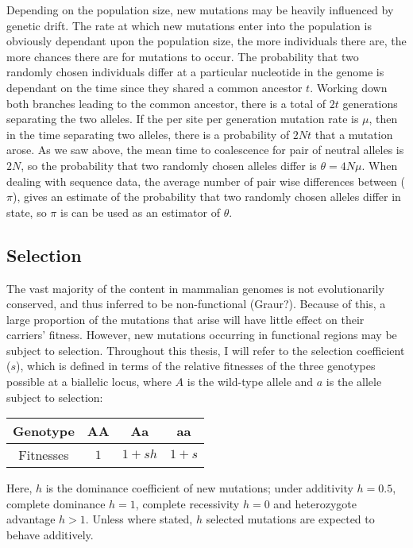 	Depending on the population size, new mutations may be heavily influenced by genetic drift. The rate at which new mutations enter into the population is obviously dependant upon the population size, the more individuals there are, the more chances there are for mutations to occur. The probability that two randomly chosen individuals differ at a particular nucleotide in the genome is dependant on the time since they shared a common ancestor $t$. Working down both branches leading to the common ancestor, there is a total of $2t$ generations separating the two alleles. If the per site per generation mutation rate is $\mu$, then in the time separating two alleles, there is a probability of $2Nt$ that a mutation arose. As we saw above, the mean time to coalescence for pair of neutral alleles is $2N$, so the probability that two randomly chosen alleles differ is
	$\theta = 4N\mu$. 	
\noindent
When dealing with sequence data, the average number of pair wise differences between ($\pi$), gives an estimate of the probability that two randomly chosen alleles differ in state, so $\pi$ is can be used as an estimator of $\theta$.


\subsection{Selection}

	The vast majority of the content in mammalian genomes is not evolutionarily conserved, and thus inferred to be non-functional (Graur?). Because of this, a large proportion of the mutations that arise will have little effect on their carriers' fitness. However, new mutations occurring in functional regions may be subject to selection. Throughout this thesis, I will refer to the selection coefficient ($s$), which is defined in terms of the relative fitnesses of the three genotypes possible at a biallelic locus, where $A$ is the wild-type allele and $a$ is the allele subject to selection:
	
\begin{tabular}{c | c | c | c }
	Genotype & AA & Aa & aa \\ \hline
	Fitnesses& $1$ & $1 + sh$ & $1 + s$ \\
\end{tabular}

\noindent
Here, $h$ is the dominance coefficient of new mutations; under additivity $h = 0.5$,  complete dominance $h = 1$, complete recessivity $h = 0$ and heterozygote advantage $h > 1$. Unless where stated, $h$ selected mutations are expected to behave additively. 

